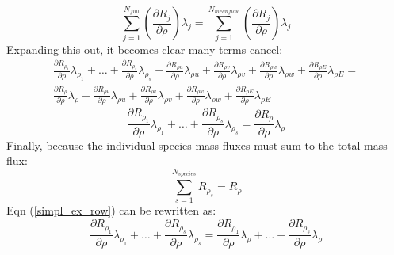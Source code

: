 \begin{equation}
  \sum_{j=1}^{N_{full}}{
    \left(\frac{\partial R_j}{\partial \rho}\right) \lambda_j}
  = \sum_{j=1}^{N_{meanflow}}{
    \left(\frac{\partial R_j}{\partial \rho}\right) \lambda_j}
  \label{eq_mean_full}
\end{equation}
Expanding this out, it becomes clear many terms cancel:
\begin{multline}
  \frac{\partial R_{\rho_1}}{\partial \rho}\lambda_{\rho_1} +
  \dots +
  \frac{\partial R_{\rho_s}}{\partial \rho}\lambda_{\rho_s} +
  \frac{\partial R_{\rho u}}{\partial \rho}\lambda_{\rho u} +
  \frac{\partial R_{\rho v}}{\partial \rho}\lambda_{\rho v} +
  \frac{\partial R_{\rho w}}{\partial \rho}\lambda_{\rho w} +
  \frac{\partial R_{\rho E}}{\partial \rho}\lambda_{\rho E} = \\
  \frac{\partial R_{\rho}}{\partial \rho}\lambda_{\rho} +
  \frac{\partial R_{\rho u}}{\partial \rho}\lambda_{\rho u} +
  \frac{\partial R_{\rho v}}{\partial \rho}\lambda_{\rho v} +
  \frac{\partial R_{\rho w}}{\partial \rho}\lambda_{\rho w} +
  \frac{\partial R_{\rho E}}{\partial \rho}\lambda_{\rho E}
  \label{expand_row}
\end{multline}
\begin{equation}
  \frac{\partial R_{\rho_1}}{\partial \rho}\lambda_{\rho_1} +
  \dots +
  \frac{\partial R_{\rho_s}}{\partial \rho}\lambda_{\rho_s} =
  \frac{\partial R_{\rho}}{\partial \rho}\lambda_{\rho}
  \label{simpl_ex_row}
\end{equation}
Finally, because the individual species mass fluxes must sum to the total mass flux:
\begin{equation}
  \sum_{s=1}^{N_{species}}{R_{\rho_s}} = R_{\rho}
  \label{sp_sum}
\end{equation}
Eqn (\ref{simpl_ex_row}) can be rewritten as:
\begin{equation}
  \frac{\partial R_{\rho_1}}{\partial \rho}\lambda_{\rho_1} +
  \dots +
  \frac{\partial R_{\rho_s}}{\partial \rho}\lambda_{\rho_s} =
  \frac{\partial R_{\rho_1}}{\partial \rho}\lambda_{\rho} +
  \dots +
  \frac{\partial R_{\rho_s}}{\partial \rho}\lambda_{\rho}
  \label{near_final}
\end{equation}

